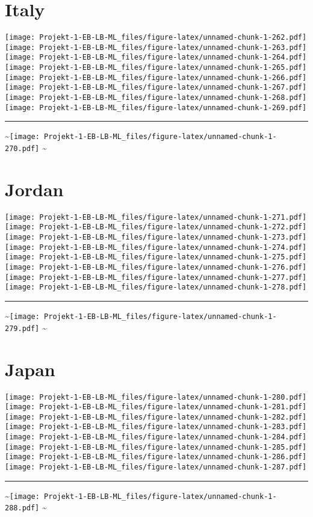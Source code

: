 \documentclass[]{article}
\begin{document}
\section{Italy}\label{italy}

\texttt{[image: Projekt-1-EB-LB-ML\_files/figure-latex/unnamed-chunk-1-262.pdf]}
\texttt{[image: Projekt-1-EB-LB-ML\_files/figure-latex/unnamed-chunk-1-263.pdf]}
\texttt{[image: Projekt-1-EB-LB-ML\_files/figure-latex/unnamed-chunk-1-264.pdf]}
\texttt{[image: Projekt-1-EB-LB-ML\_files/figure-latex/unnamed-chunk-1-265.pdf]}
\texttt{[image: Projekt-1-EB-LB-ML\_files/figure-latex/unnamed-chunk-1-266.pdf]}
\texttt{[image: Projekt-1-EB-LB-ML\_files/figure-latex/unnamed-chunk-1-267.pdf]}
\texttt{[image: Projekt-1-EB-LB-ML\_files/figure-latex/unnamed-chunk-1-268.pdf]}
\texttt{[image: Projekt-1-EB-LB-ML\_files/figure-latex/unnamed-chunk-1-269.pdf]}
\bigskip\hrule\bigskip
\textasciitilde{}\hfill\texttt{[image: Projekt-1-EB-LB-ML\_files/figure-latex/unnamed-chunk-1-270.pdf]}
\hfill \textasciitilde{} \vfill\eject

\section{Jordan}\label{jordan}

\texttt{[image: Projekt-1-EB-LB-ML\_files/figure-latex/unnamed-chunk-1-271.pdf]}
\texttt{[image: Projekt-1-EB-LB-ML\_files/figure-latex/unnamed-chunk-1-272.pdf]}
\texttt{[image: Projekt-1-EB-LB-ML\_files/figure-latex/unnamed-chunk-1-273.pdf]}
\texttt{[image: Projekt-1-EB-LB-ML\_files/figure-latex/unnamed-chunk-1-274.pdf]}
\texttt{[image: Projekt-1-EB-LB-ML\_files/figure-latex/unnamed-chunk-1-275.pdf]}
\texttt{[image: Projekt-1-EB-LB-ML\_files/figure-latex/unnamed-chunk-1-276.pdf]}
\texttt{[image: Projekt-1-EB-LB-ML\_files/figure-latex/unnamed-chunk-1-277.pdf]}
\texttt{[image: Projekt-1-EB-LB-ML\_files/figure-latex/unnamed-chunk-1-278.pdf]}
\bigskip\hrule\bigskip
\textasciitilde{}\hfill\texttt{[image: Projekt-1-EB-LB-ML\_files/figure-latex/unnamed-chunk-1-279.pdf]}
\hfill \textasciitilde{} \vfill\eject

\section{Japan}\label{japan}

\texttt{[image: Projekt-1-EB-LB-ML\_files/figure-latex/unnamed-chunk-1-280.pdf]}
\texttt{[image: Projekt-1-EB-LB-ML\_files/figure-latex/unnamed-chunk-1-281.pdf]}
\texttt{[image: Projekt-1-EB-LB-ML\_files/figure-latex/unnamed-chunk-1-282.pdf]}
\texttt{[image: Projekt-1-EB-LB-ML\_files/figure-latex/unnamed-chunk-1-283.pdf]}
\texttt{[image: Projekt-1-EB-LB-ML\_files/figure-latex/unnamed-chunk-1-284.pdf]}
\texttt{[image: Projekt-1-EB-LB-ML\_files/figure-latex/unnamed-chunk-1-285.pdf]}
\texttt{[image: Projekt-1-EB-LB-ML\_files/figure-latex/unnamed-chunk-1-286.pdf]}
\texttt{[image: Projekt-1-EB-LB-ML\_files/figure-latex/unnamed-chunk-1-287.pdf]}
\bigskip\hrule\bigskip
\textasciitilde{}\hfill\texttt{[image: Projekt-1-EB-LB-ML\_files/figure-latex/unnamed-chunk-1-288.pdf]}
\hfill \textasciitilde{} \vfill\eject
\end{document}
